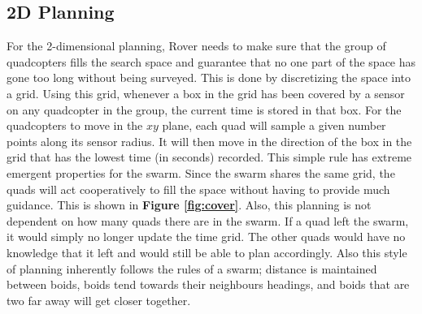 \documentclass[12pt]{article}
\newcommand{\fig}[1]{\textbf{Figure \ref{fig:#1}}}
\begin{document}
\subsection{2D Planning}

For the 2-dimensional planning, Rover needs to make sure that the group of
quadcopters fills the search space and guarantee that no one part of the space
has gone too long without being surveyed. This is done by discretizing the
space into a grid. Using this grid, whenever a box in the grid has been covered
by a sensor on any quadcopter in the group, the current time is stored in that
box. For the quadcopters to move in the $xy$ plane, each quad will sample a
given number points along its sensor radius. It will then move in the direction
of the box in the grid that has the lowest time (in seconds) recorded. This
simple rule has extreme emergent properties for the swarm. Since the swarm
shares the same grid, the quads will act cooperatively to fill the space without
having to provide much guidance. This is shown in \fig{cover}. Also, this
planning is not dependent on how many quads there are in the swarm. If a quad
left the swarm, it would simply no longer update the time grid. The other quads
would have no knowledge that it left and would still be able to plan
accordingly. Also this style of planning inherently follows the rules of a
swarm; distance is maintained between boids, boids tend towards their
neighbours headings, and boids that are two far away will get closer together.
\end{document}
